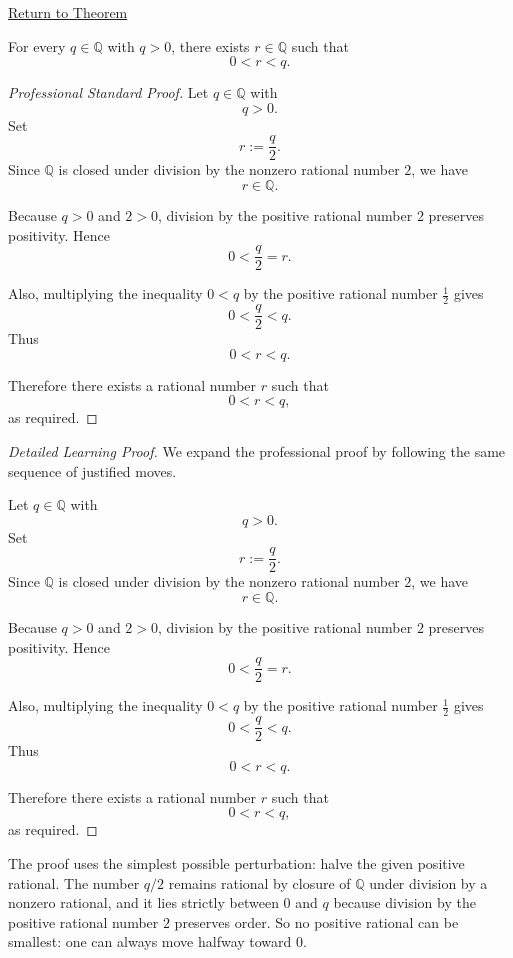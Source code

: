 \newpage
{}
\label{prf:q-has-no-minimum-positive-element}

\begin{remark*}[Return]
\hyperref[thm:q-has-no-minimum-positive-element]{Return to Theorem}
\end{remark*}

\begin{theorem*}
For every $q\in\mathbb{Q}$ with $q>0$, there exists $r\in\mathbb{Q}$ such that
\[
0<r<q.
\]
\end{theorem*}

\begin{proof}[Professional Standard Proof]
\LRAProofBodyStart
Let $q\in\mathbb{Q}$ with
\[
q>0.
\]
Set
\[
r:=\frac{q}{2}.
\]
Since $\mathbb{Q}$ is closed under division by the nonzero rational number
$2$, we have
\[
r\in\mathbb{Q}.
\]

Because $q>0$ and $2>0$, division by the positive rational number $2$
preserves positivity.  Hence
\[
0<\frac{q}{2}=r.
\]

Also, multiplying the inequality $0<q$ by the positive rational number
$\frac{1}{2}$ gives
\[
0<\frac{q}{2}<q.
\]
Thus
\[
0<r<q.
\]

Therefore there exists a rational number $r$ such that
\[
0<r<q,
\]
as required.
\end{proof}

\begin{proof}[Detailed Learning Proof]
\LRAProofBodyStart
We expand the professional proof by following the same sequence of justified moves.

Let $q\in\mathbb{Q}$ with
\[
q>0.
\]
Set
\[
r:=\frac{q}{2}.
\]
Since $\mathbb{Q}$ is closed under division by the nonzero rational number
$2$, we have
\[
r\in\mathbb{Q}.
\]

Because $q>0$ and $2>0$, division by the positive rational number $2$
preserves positivity.  Hence
\[
0<\frac{q}{2}=r.
\]

Also, multiplying the inequality $0<q$ by the positive rational number
$\frac{1}{2}$ gives
\[
0<\frac{q}{2}<q.
\]
Thus
\[
0<r<q.
\]

Therefore there exists a rational number $r$ such that
\[
0<r<q,
\]
as required.
\end{proof}

\begin{remark*}
The proof uses the simplest possible perturbation: halve the given positive
rational.  The number $q/2$ remains rational by closure of $\mathbb{Q}$ under
division by a nonzero rational, and it lies strictly between $0$ and $q$
because division by the positive rational number $2$ preserves order.  So no
positive rational can be smallest: one can always move halfway toward $0$.
\end{remark*}

